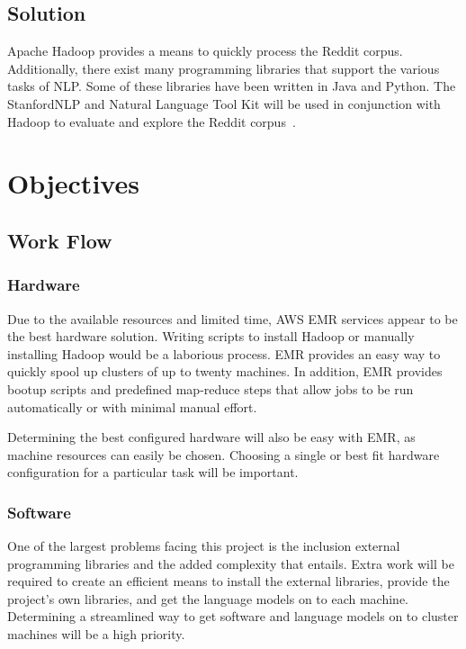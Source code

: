 \documentclass[12pt,a4paper]{article}
\begin{document}
\subsection{Solution}

Apache Hadoop provides a means to quickly process the Reddit
corpus. Additionally, there exist many programming libraries
that support the various tasks of NLP. Some of these libraries have
been written in Java and Python. The StanfordNLP and Natural
Language Tool Kit will be used in conjunction with Hadoop
to evaluate and explore the Reddit corpus~\cite{stanfordnlp, pythonnlp, Shvachko:2010:HDF:1913798.1914427}. 

\section{Objectives}

\subsection{Work Flow}

\subsubsection{Hardware}

Due to the available resources and limited time,
AWS EMR services appear to be the best hardware solution.
Writing scripts to install Hadoop or manually
installing Hadoop would be a laborious process. EMR
provides an easy way to quickly spool up clusters of up
to twenty machines. In addition, EMR provides bootup
scripts and predefined map-reduce steps that allow
jobs to be run automatically or with minimal
manual effort. 

Determining the best configured hardware will also
be easy with EMR, as machine resources can easily
be chosen. Choosing a single or best fit hardware
configuration for a particular task will be important.

\subsubsection{Software}

One of the largest problems facing this project is the
inclusion external programming libraries and the added
complexity that entails. Extra work will be required
to create an efficient means to install the external
libraries, provide the project's own libraries, and
get the language models on to each machine. Determining
a streamlined way to get software and language models
on to cluster machines will be a high priority.
\end{document}
